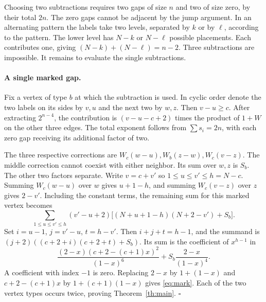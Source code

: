 \documentclass[11pt,letterpaper]{article}
\begin{document}
Choosing two subtractions requires two gaps of size $n$ and two of size zero, by their total $2n$. The zero gaps cannot be adjacent by the jump argument. In an alternating pattern the labels take two levels, separated by $k$ or by $\ell$, according to the pattern. The lower level has $N-k$ or $N-\ell$ possible placements. Each contributes one, giving $(N-k)+(N-\ell)=n-2$. Three subtractions are impossible. It remains to evaluate the single subtractions.

\newpage
\paragraph{A single marked gap.}
Fix a vertex of type $b$ at which the subtraction is used. In cyclic order denote the two labels on its sides by $v,u$ and the next two by $w,z$. Then $v-u\ge c$. After extracting $2^{n-4}$, the contribution is $(v-u-c+2)$ times the product of $1+W$ on the other three edges. The total exponent follows from $\sum s_i=2n$, with each zero gap receiving its additional factor of two.

The three respective corrections are $W_c(w-u),W_b(z-w),W_c(v-z)$. The middle correction cannot coexist with either neighbor. Its sum over $w,z$ is $S_b$. The other two factors separate. Write $v=c+v'$ so $1\le u\le v'\le h=N-c$. Summing $W_c(w-u)$ over $w$ gives $u+1-h$, and summing $W_c(v-z)$ over $z$ gives $2-v'$. Including the constant terms, the remaining sum for this marked vertex becomes
\[
 \sum_{1\le u\le v'\le h}(v'-u+2)
       \big[(N+u+1-h)(N+2-v')+S_b\big].
\]
Set $i=u-1$, $j=v'-u$, $t=h-v'$. Then $i+j+t=h-1$, and the summand is $(j+2)((c+2+i)(c+2+t)+S_b)$. Its sum is the coefficient of $x^{h-1}$ in
\[
 \frac{(2-x)(c+2-(c+1)x)^2}{(1-x)^6}
       +S_b\frac{2-x}{(1-x)^4}.
\]
A coefficient with index $-1$ is zero. Replacing $2-x$ by $1+(1-x)$ and $c+2-(c+1)x$ by $1+(c+1)(1-x)$ gives \eqref{eq:mark}. Each of the two vertex types occurs twice, proving Theorem~\ref{th:main}. \hfill$\square$
\end{document}

